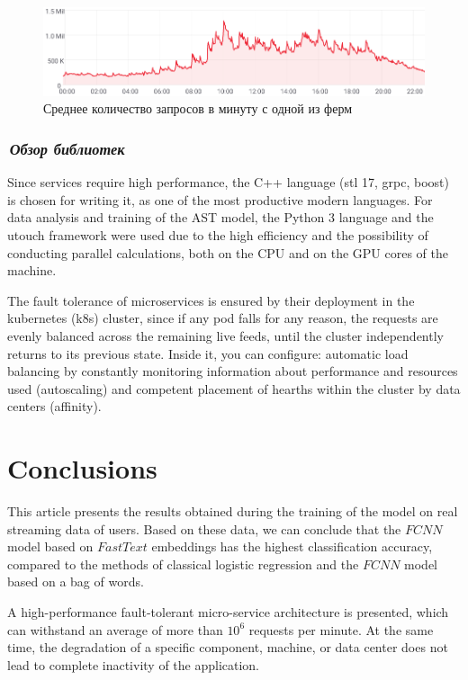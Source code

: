 \documentclass[12pt]{article}
\begin{document}
\begin{figure}[h!]
	\center
	\includegraphics[scale=0.5]{processed_messages.png}
	\caption{Среднее количество запросов в минуту с одной из ферм}
	\label{fig:04}
\end{figure}

\subsubsection*{\it\,Обзор библиотек}

Since services require high performance, the C++ language (stl 17, grpc, boost) is chosen for writing it, as one of the most productive modern languages. For data analysis and training of the AST model, the Python 3 language and the utouch framework were used due to the high efficiency and the possibility of conducting parallel calculations, both on the CPU and on the GPU cores of the machine.

The fault tolerance of microservices is ensured by their deployment in the kubernetes (k8s) cluster, since if any pod falls for any reason, the requests are evenly balanced across the remaining live feeds, until the cluster independently returns to its previous state. Inside it, you can configure: automatic load balancing by constantly monitoring information about performance and resources used (autoscaling) and competent placement of hearths within the cluster by data centers (affinity).

\section{Conclusions}

This article presents the results obtained during the training of the model on real streaming data of users. Based on these data, we can conclude that the $FCNN$ model based on $Fast Text$ embeddings has the highest classification accuracy, compared to the methods of classical logistic regression and the $FCNN$ model based on a bag of words.


A high-performance fault-tolerant micro-service architecture is presented, which can withstand an average of more than $10^6$  requests per minute. At the same time, the degradation of a specific component, machine, or data center does not lead to complete inactivity of the application.
\end{document}
